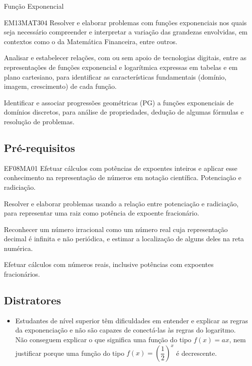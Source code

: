 \begin{apresentacao}{Função Exponencial}
\begin{habilities}{EM13MAT304} 
Resolver e elaborar problemas com funções exponenciais nos quais seja necessário compreender e interpretar a variação das grandezas envolvidas, em contextos como o da Matemática Financeira, entre outros.

Analisar e estabelecer relações, com ou sem apoio de tecnologias digitais, entre as representações de funções exponencial e logarítmica expressas em tabelas e em plano cartesiano, para identificar as características fundamentais (domínio, imagem, crescimento) de cada função.

Identificar e associar progressões geométricas (PG) a funções exponenciais de domínios discretos, para análise de propriedades, dedução de algumas fórmulas e resolução de problemas.
\end{habilities}

\subsection*{Pré-requisitos}

\begin{habilities}{EF08MA01} 
Efetuar cálculos com potências de expoentes inteiros e aplicar esse conhecimento na representação de números em notação científica. Potenciação e radiciação.

Resolver e elaborar problemas usando a relação entre potenciação e radiciação, para representar uma raiz como potência de expoente fracionário.

\clearpage
{} 
Reconhecer um número irracional como um número real cuja representação decimal é infinita e não periódica, e estimar a localização de alguns deles na reta numérica.

Efetuar cálculos com números reais, inclusive potências com expoentes fracionários.
\end{habilities}

\subsection*{Distratores}

\begin{itemize}

\item Estudantes de nível superior têm dificuldades em entender e explicar as regras da exponenciação e não são capazes de conectá-las às regras do logaritmo. Não conseguem explicar o que significa uma função do tipo $f(x)=ax$, nem justificar porque uma função do tipo $f(x)=\left(\dfrac{1}{2} \right)^{x}$ é decrescente. \citep{Weber2002}


\end{itemize}
\end{apresentacao}
